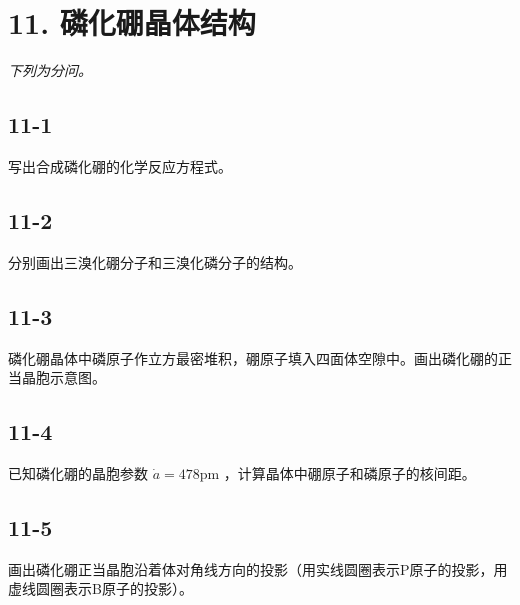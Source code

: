 \section*{11. 磷化硼晶体结构}
\textit{下列为分问。}

\subsection*{11-1}
写出合成磷化硼的化学反应⽅程式。

\subsection*{11-2}
分别画出三溴化硼分⼦和三溴化磷分⼦的结构。

\subsection*{11-3}
磷化硼晶体中磷原⼦作⽴⽅最密堆积，硼原⼦填⼊四⾯体空隙中。画出磷化硼的正当晶胞⽰意图。

\subsection*{11-4}
已知磷化硼的晶胞参数 $\dot { a } = 4 7 8 \mathrm { p m }$ ，计算晶体中硼原⼦和磷原⼦的核间距。

\subsection*{11-5}
画出磷化硼正当晶胞沿着体对⻆线⽅向的投影（⽤实线圆圈表⽰P原⼦的投影，⽤虚线圆圈表⽰B原⼦的投影）。
